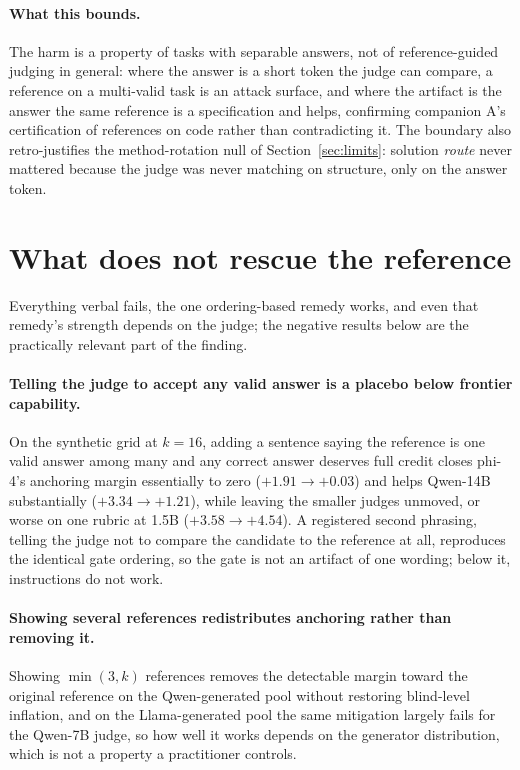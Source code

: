 \documentclass[11pt]{article}
\begin{document}
\paragraph{What this bounds.}
The harm is a property of tasks with separable answers, not of reference-guided judging in general: where the answer is a short token the judge can compare, a reference on a multi-valid task is an attack surface, and where the artifact is the answer the same reference is a specification and helps, confirming companion A's certification of references on code rather than contradicting it.
The boundary also retro-justifies the method-rotation null of Section~\ref{sec:limits}: solution \emph{route} never mattered because the judge was never matching on structure, only on the answer token.

\section{What does not rescue the reference}
\label{sec:norescue}

Everything verbal fails, the one ordering-based remedy works, and even that remedy's strength depends on the judge; the negative results below are the practically relevant part of the finding.

\paragraph{Telling the judge to accept any valid answer is a placebo below frontier capability.}
On the synthetic grid at $k{=}16$, adding a sentence saying the reference is one valid answer among many and any correct answer deserves full credit closes phi-4's anchoring margin essentially to zero ($+1.91 \to +0.03$) and helps Qwen-14B substantially ($+3.34 \to +1.21$), while leaving the smaller judges unmoved, or worse on one rubric at 1.5B ($+3.58 \to +4.54$).
A registered second phrasing, telling the judge not to compare the candidate to the reference at all, reproduces the identical gate ordering, so the gate is not an artifact of one wording; below it, instructions do not work.

\paragraph{Showing several references redistributes anchoring rather than removing it.}
Showing $\min(3,k)$ references removes the detectable margin toward the original reference on the Qwen-generated pool without restoring blind-level inflation, and on the Llama-generated pool the same mitigation largely fails for the Qwen-7B judge, so how well it works depends on the generator distribution, which is not a property a practitioner controls.
\end{document}
